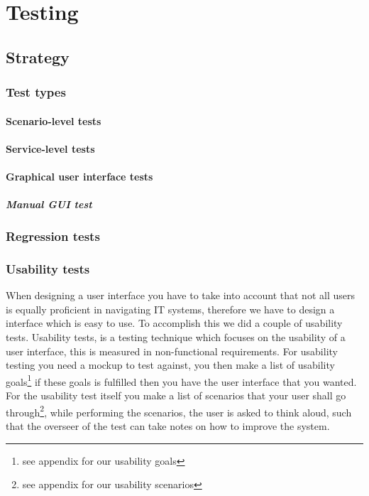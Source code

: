 \chapter{Testing}
\label{Testing}

\section{Strategy}
\label{Testing_Strategy}

\subsection{Test types}
\label{Testing_Strategy_Types}

\subsubsection{Scenario-level tests}
\label{Testing_Strategy_Types_Scenario}

\subsubsection{Service-level tests}
\label{Testing_Strategy_Types_Service}

\subsubsection{Graphical user interface tests}
\label{Testing_Strategy_Types_EndUser}

\paragraph{Manual GUI test}

\subsection{Regression tests}
\label{Testing_Strategy_Regression}

\subsection{Usability tests}
\label{Testing_Strategy_Usability}
When designing a user interface you have to take into account that not all users is equally proficient in navigating IT systems, therefore we have to design a interface which is easy to use. To accomplish this we did a couple of usability tests. Usability tests, is a testing technique which focuses on the usability of a user interface, this is measured in non-functional requirements. For usability testing you need a mockup to test against, you then make a list of usability goals\footnote{see appendix for our usability goals} if these goals is fulfilled then you have the user interface that you wanted. For the usability test itself you make a list of scenarios that your user shall go through\footnote{see appendix for our usability scenarios}, while performing the scenarios, the user is asked to think aloud, such that the overseer of the test can take notes on how to improve the system.

